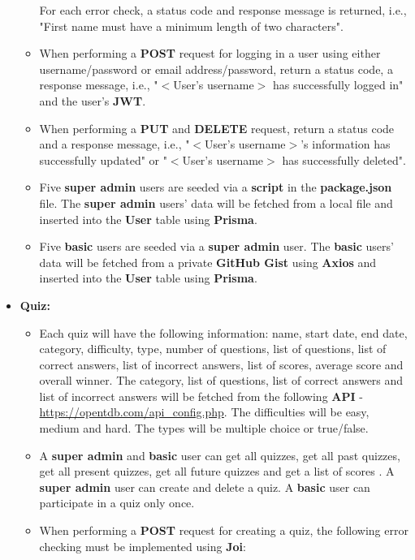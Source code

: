 \documentclass{article}
\begin{document}
\begin{itemize}
\begin{itemize}
\begin{itemize}
		\end{itemize}
		For each error check, a status code and response message is returned, i.e., "First name must have a minimum length of two characters".
		\item When performing a \textbf{POST} request for logging in a user using either username/password or email address/password, return a status code, a response message, i.e., "$<$User's username$>$ has successfully logged in" and the user's \textbf{JWT}.
		\item When performing a \textbf{PUT} and \textbf{DELETE} request, return a status code and a response message, i.e., "$<$User's username$>$'s information has successfully updated" or "$<$User's username$>$ has successfully deleted".
		\item Five \textbf{super admin} users are seeded via a \textbf{script} in the \textbf{package.json} file. The \textbf{super admin} users' data will be fetched from a local file and inserted into the \textbf{User} table using \textbf{Prisma}.  
		\item Five \textbf{basic} users are seeded via a \textbf{super admin} user. The \textbf{basic} users' data will be fetched from a private \textbf{GitHub Gist} using \textbf{Axios} and inserted into the \textbf{User} table using \textbf{Prisma}. 
	\end{itemize} 
	\item \textbf{Quiz:}
	\begin{itemize}
		\item Each quiz will have the following information: name, start date, end date, category, difficulty, type, number of questions, list of questions, list of correct answers, list of incorrect answers, list of scores, average score and overall winner. The category, list of questions, list of correct answers and list of incorrect answers will be fetched from the following \textbf{API} - \href{https://opentdb.com/api\_config.php}{https://opentdb.com/api\_config.php}. The difficulties will be easy, medium and hard. The types will be multiple choice or true/false.
		\item A \textbf{super admin} and \textbf{basic} user can get all quizzes, get all past quizzes, get all present quizzes, get all future quizzes and get a list of scores . A \textbf{super admin} user can create and delete a quiz. A \textbf{basic} user can participate in a quiz only once.
		\item When performing a \textbf{POST} request for creating a quiz, the following error checking must be implemented using \textbf{Joi}:

\end{itemize}
\end{itemize}
\end{document}
